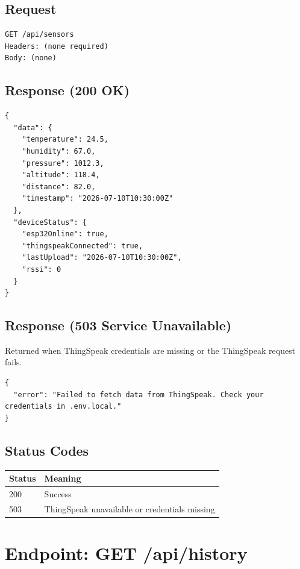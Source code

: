 \subsection{Request}
\begin{lstlisting}[language={},caption={GET /api/sensors request}]
GET /api/sensors
Headers: (none required)
Body: (none)
\end{lstlisting}

\subsection{Response (200 OK)}
\begin{lstlisting}[language={},caption={GET /api/sensors success response}]
{
  "data": {
    "temperature": 24.5,
    "humidity": 67.0,
    "pressure": 1012.3,
    "altitude": 118.4,
    "distance": 82.0,
    "timestamp": "2026-07-10T10:30:00Z"
  },
  "deviceStatus": {
    "esp32Online": true,
    "thingspeakConnected": true,
    "lastUpload": "2026-07-10T10:30:00Z",
    "rssi": 0
  }
}
\end{lstlisting}

\subsection{Response (503 Service Unavailable)}
Returned when ThingSpeak credentials are missing or the ThingSpeak request fails.
\begin{lstlisting}[language={},caption={GET /api/sensors error response}]
{
  "error": "Failed to fetch data from ThingSpeak. Check your credentials in .env.local."
}
\end{lstlisting}

\subsection{Status Codes}
\begin{tabular}{|l|l|}
\hline
\rowcolor{FloodLight}
\textbf{Status} & \textbf{Meaning} \\
\hline
200 & Success \\
503 & ThingSpeak unavailable or credentials missing \\
\hline
\end{tabular}

\section{Endpoint: GET /api/history}

